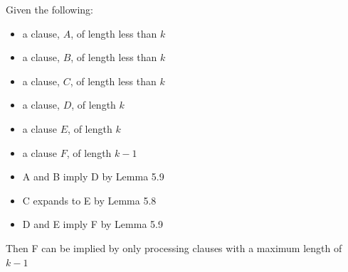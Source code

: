 \documentclass[manuscript]{acmart}
\begin{document}
    \begin{lemma}
        Given the following:
        \begin{itemize}
            \item a clause, $A$, of length less than $k$
            \item a clause, $B$, of length less than $k$
            \item a clause, $C$, of length less than $k$
            \item a clause, $D$, of length $k$
            \item a clause $E$, of length $k$
            \item a clause $F$, of length $k - 1$
            \item A and B imply D by Lemma 5.9
            \item C expands to E by Lemma 5.8
            \item D and E imply F by Lemma 5.9
        \end{itemize}
        Then F can be implied by only processing clauses with a maximum
        length of $k-1$
    \end{lemma}
\end{document}

